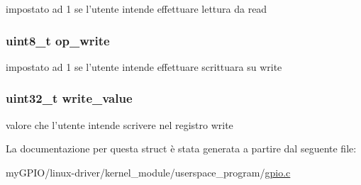 impostato ad 1 se l'utente intende effettuare lettura da read 

\hypertarget{structparam__t_a67752de733f167918a4e966354183a69}{
\subsubsection[{op\+\_\+write}]{\setlength{\rightskip}{0pt plus 5cm}uint8\+\_\+t op\+\_\+write}}\label{structparam__t_a67752de733f167918a4e966354183a69}


impostato ad 1 se l'utente intende effettuare scrittuara su write 

\hypertarget{structparam__t_a09e0cff25312ab7f748a3063c038a2d9}{
\subsubsection[{write\+\_\+value}]{\setlength{\rightskip}{0pt plus 5cm}uint32\+\_\+t write\+\_\+value}}\label{structparam__t_a09e0cff25312ab7f748a3063c038a2d9}


valore che l'utente intende scrivere nel registro write 



La documentazione per questa struct è stata generata a partire dal seguente file\+:\begin{DoxyCompactItemize}
\item 
my\+G\+P\+I\+O/linux-\/driver/kernel\+\_\+module/userspace\+\_\+program/\hyperlink{gpio_8c}{gpio.\+c}\end{DoxyCompactItemize}
